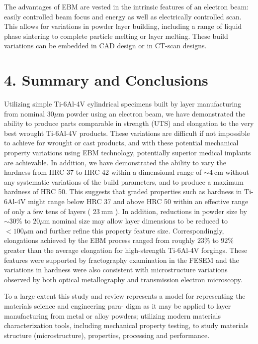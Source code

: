 \documentclass[10pt]{article}
\begin{document}
The advantages of EBM are vested in the intrinsic features of an electron beam: easily controlled beam focus and energy as well as electrically controlled scan. This allows for variations in powder layer building, including a range of liquid phase sintering to complete particle melting or layer melting. These build variations can be embedded in CAD design or in CT-scan designs.

\section*{4. Summary and Conclusions}
Utilizing simple Ti-6Al-4V cylindrical specimens built by layer manufacturing from nominal $30 \mu \mathrm{m}$ powder using an electron beam, we have demonstrated the ability to produce parts comparable in strength (UTS) and elongation to the very best wrought Ti-6Al-4V products. These variations are difficult if not impossible to achieve for wrought or cast products, and with these potential mechanical property variations using EBM technology, potentially superior medical implants are achievable. In addition, we have demonstrated the ability to vary the hardness from HRC 37 to HRC 42 within a dimensional range of $\sim 4 \mathrm{~cm}$ without any systematic variations of the build parameters, and to produce a maximum hardness of HRC 50. This suggests that graded properties such as hardness in Ti-6Al-4V might range below HRC 37 and above HRC 50 within an effective range of only a few tens of layers ( 2$3 \mathrm{~mm}$ ). In addition, reductions in powder size by $\sim 30 \%$ to $20 \mu \mathrm{m}$ nominal size may allow layer dimensions to be reduced to $<100 \mu \mathrm{m}$ and further refine this property feature size. Correspondingly, elongations achieved by the EBM process ranged from roughly $23 \%$ to $92 \%$ greater than the average elongation for high-strength Ti-6Al-4V forgings. These features were supported by fractography examination in the FESEM and the variations in hardness were also consistent with microstructure variations observed by both optical metallography and transmission electron microscopy.

To a large extent this study and review represents a model for representing the materials science and engineering para- digm as it may be applied to layer manufacturing from metal or alloy powders; utilizing modern materials characterization tools, including mechanical property testing, to study materials structure (microstructure), properties, processing and performance.
\end{document}
